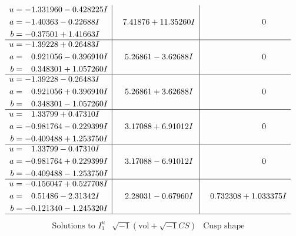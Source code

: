 \documentclass[1p]{elsarticle_modified}
\theoremstyle{definition}
\newcommand{\I}{\sqrt{-1}}
\begin{document}
$$\begin{array}{c|c|c}
\begin{aligned}
u &= -1.331960 - 0.428225 I \\
a &= -1.40363 - 0.22688 I \\
b &= -0.37501 + 1.41663 I\end{aligned}
 & \phantom{-}7.41876 + 11.35260 I & \phantom{-0.000000 } 0 \\ \hline\begin{aligned}
u &= -1.39228 + 0.26483 I \\
a &= \phantom{-}0.921056 - 0.396910 I \\
b &= \phantom{-}0.348301 + 1.057260 I\end{aligned}
 & \phantom{-}5.26861 - 3.62688 I & \phantom{-0.000000 } 0 \\ \hline\begin{aligned}
u &= -1.39228 - 0.26483 I \\
a &= \phantom{-}0.921056 + 0.396910 I \\
b &= \phantom{-}0.348301 - 1.057260 I\end{aligned}
 & \phantom{-}5.26861 + 3.62688 I & \phantom{-0.000000 } 0 \\ \hline\begin{aligned}
u &= \phantom{-}1.33799 + 0.47310 I \\
a &= -0.981764 - 0.229399 I \\
b &= -0.409488 + 1.253750 I\end{aligned}
 & \phantom{-}3.17088 + 6.91012 I & \phantom{-0.000000 } 0 \\ \hline\begin{aligned}
u &= \phantom{-}1.33799 - 0.47310 I \\
a &= -0.981764 + 0.229399 I \\
b &= -0.409488 - 1.253750 I\end{aligned}
 & \phantom{-}3.17088 - 6.91012 I & \phantom{-0.000000 } 0 \\ \hline\begin{aligned}
u &= -0.156047 + 0.527708 I \\
a &= \phantom{-}0.51486 - 2.31342 I \\
b &= -0.121340 - 1.245320 I\end{aligned}
 & \phantom{-}2.28031 - 0.67960 I & \phantom{-}0.732308 + 1.033375 I\\
 \hline 
 \end{array}$$\newpage$$\begin{array}{c|c|c}  
\text{Solutions to }I^u_{1}& \I (\text{vol} + \sqrt{-1}CS) & \text{Cusp shape}\\
 \hline 
\begin{aligned}

\end{aligned}
\end{array}$$
\end{document}

